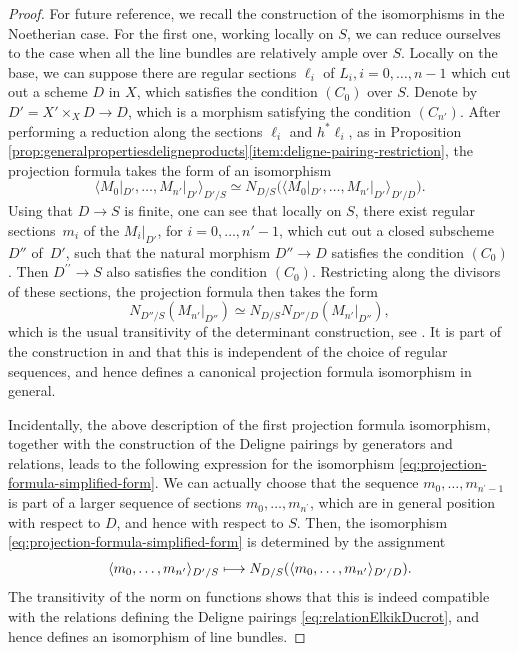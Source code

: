 \documentclass[11pt]{article}
\newcommand\mto{\mathchoice{\longmapsto}{\mapsto}{\mapsto}{\mapsto}}
\theoremstyle{plain}
\theoremstyle{definition}
\begin{document}
\begin{proof}
For future reference, we recall the construction of the isomorphisms in the Noetherian case. For the first one, working locally on $S$, we can reduce ourselves to the case when all the line bundles are relatively ample over $S$. Locally on the base, we can suppose there are regular sections $\ell_i$ of $L_{i}, i =0,\ldots, n-1$ which cut out a scheme $D$ in $X$, which satisfies the condition $(C_0)$ over $S$. Denote by $D' = X' \times_X D \to D$, which is a morphism satisfying the condition $(C_{n'})$. After performing a reduction along the sections $\ell_i$ and $h^\ast \ell_i$, as in Proposition \ref{prop:generalpropertiesdeligneproducts}\eqref{item:deligne-pairing-restriction}, the projection formula takes the form of an isomorphism
\begin{equation}\label{eq:projection-formula-simplified-form}
\langle M_{0} |_{D'}, \ldots, M_{n'} |_{D'}\rangle_{D'/S} \simeq N_{D/S} \bigl(\langle M_{0}|_{D'}, \ldots, M_{n'}|_{D'}\rangle_{D'/D}\bigr).
\end{equation}
Using that $D \to S$ is finite, one can see that locally on $S$, there exist regular sections~$m_{i}$ of the $M_{i}|_{D'}$, for $i=0,\ldots, n'-1$, which cut out a closed subscheme $D''$ of~$D'$, such that the natural morphism $D'' \to D$ satisfies the condition $(C_0)$. Then $D^{\prime\prime}\to S$ also satisfies the condition $(C_{0})$. Restricting along the divisors of these sections, the projection formula then takes the form
\begin{displaymath}
N_{D''/S} (M_{n'}|_{D''}) \simeq N_{D/S} N_{D''/D} (M_{n'}|_{D''}),
\end{displaymath}
which is the usual transitivity of the determinant construction, see \cite[Lem.\,21.5.7.2]{EGAIV4}. It is part of the construction in \cite[\textsection IV.2]{Elkikfib} and \cite[]{Munoz} that this is independent of the choice of regular sequences, and hence defines a canonical projection formula isomorphism in general.

Incidentally, the above description of the first projection formula isomorphism, together with the construction of the Deligne pairings by generators and relations, leads to the following expression for the isomorphism \eqref{eq:projection-formula-simplified-form}. We can actually choose that the sequence $m_{0},\ldots,m_{n^{\prime}-1}$ is part of a larger sequence of sections $m_{0},\ldots,m_{n^{\prime}}$, which are in general position with respect to $D$, and hence with respect to $S$. Then, the isomorphism \eqref{eq:projection-formula-simplified-form} is determined by the assignment
\begin{displaymath}
\langle m_{0},\ldots, m_{n^{\prime}}\rangle_{D^{\prime}/S}\mto N_{D/S}(\langle m_{0},\ldots, m_{n^{\prime}}\rangle_{D^{\prime}/D}).
\end{displaymath}
The transitivity of the norm on functions shows that this is indeed compatible with the relations defining the Deligne pairings \eqref{eq:relationElkikDucrot}, and hence defines an isomorphism of line bundles.


\end{proof}
\end{document}
